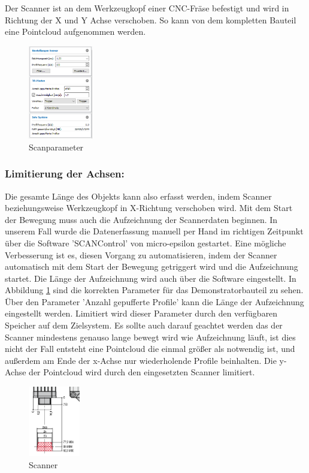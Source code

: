 \documentclass[../main.tex]{subfiles}
\begin{document}
Der Scanner ist an dem Werkzeugkopf einer CNC-Fräse befestigt und wird 
in Richtung der X und Y Achse verschoben. So kann von dem kompletten Bauteil eine 
Pointcloud aufgenommen werden.


\newpage

\begin{figure}
    \includegraphics[width=0.25\textwidth]{images/Parameter_Scan.png}
    \caption{Scanparameter}
    \label{fig:scanparameter}
\end{figure}

\subsubsection{Limitierung der Achsen:}

Die gesamte Länge des Objekts kann also erfasst werden, indem Scanner 
beziehungsweise Werkzeugkopf in X-Richtung verschoben wird. Mit dem Start der 
Bewegung muss auch die Aufzeichnung der Scannerdaten beginnen. In unserem Fall wurde
die Datenerfassung manuell per Hand im richtigen Zeitpunkt über die Software 
'SCANControl' von micro-epsilon gestartet. 
Eine mögliche Verbesserung ist es, diesen Vorgang zu automatisieren, indem der 
Scanner automatisch mit dem Start der Bewegung getriggert wird und die Aufzeichnung
startet. Die Länge der Aufzeichnung wird auch über die Software eingestellt. 
In Abbildung \ref{fig:scanparameter} sind die korrekten Parameter für das 
Demonstratorbauteil zu sehen. Über den Parameter 'Anzahl gepufferte Profile' kann 
die Länge der Aufzeichnung eingestellt werden. Limitiert wird dieser Parameter 
durch den verfügbaren Speicher auf dem Zielsystem. Es sollte auch darauf geachtet 
werden das der Scanner mindestens genauso lange bewegt wird wie Aufzeichnung läuft, 
ist dies nicht der Fall entsteht eine Pointcloud die einmal größer als notwendig ist, 
und außerdem am Ende der x-Achse nur wiederholende Profile beinhalten. 
Die y-Achse der Pointcloud wird durch den eingesetzten Scanner limitiert. 

\begin{figure}
    \includegraphics[width=0.2\textwidth]{images/Scanner.PNG}
    \caption{Scanner}
    \label{fig:scanner}
\end{figure}
\end{document}
